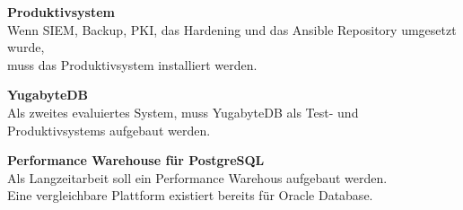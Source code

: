 \begin{flushleft}
\begin{description}
        \item \textbf{Produktivsystem}\hfill \\Wenn \Gls{SIEM}, Backup, \Gls{PKI}, das Hardening und das \Gls{Ansible} Repository umgesetzt wurde,\\muss das Produktivsystem installiert werden.
        \item \textbf{YugabyteDB}\hfill \\Als zweites evaluiertes System, muss YugabyteDB als Test- und Produktivsystems aufgebaut werden.
        \item \textbf{Performance Warehouse für \Gls{PostgreSQL}}\hfill \\Als Langzeitarbeit soll ein Performance Warehous aufgebaut werden.\\Eine vergleichbare Plattform existiert bereits für \Gls{Oracle Database}.
    \end{description}
\end{flushleft}